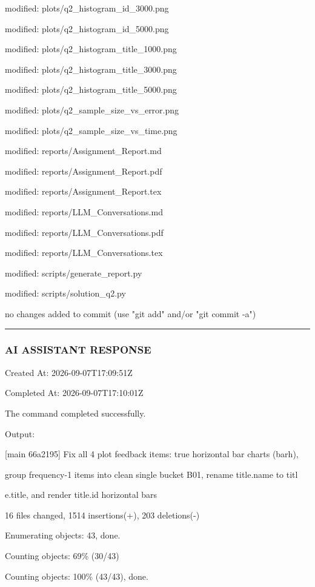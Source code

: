 \documentclass[11pt,a4paper]{article}
\begin{document}
modified:   plots/q2\_histogram\_id\_3000.png

modified:   plots/q2\_histogram\_id\_5000.png

modified:   plots/q2\_histogram\_title\_1000.png

modified:   plots/q2\_histogram\_title\_3000.png

modified:   plots/q2\_histogram\_title\_5000.png

modified:   plots/q2\_sample\_size\_vs\_error.png

modified:   plots/q2\_sample\_size\_vs\_time.png

modified:   reports/Assignment\_Report.md

modified:   reports/Assignment\_Report.pdf

modified:   reports/Assignment\_Report.tex

modified:   reports/LLM\_Conversations.md

modified:   reports/LLM\_Conversations.pdf

modified:   reports/LLM\_Conversations.tex

modified:   scripts/generate\_report.py

modified:   scripts/solution\_q2.py


no changes added to commit (use "git add" and/or "git commit -a")


\hrule

\subsubsection{AI ASSISTANT RESPONSE}

Created At: 2026-09-07T17:09:51Z

Completed At: 2026-09-07T17:10:01Z


The command completed successfully.

Output:

[main 66a2195] Fix all 4 plot feedback items: true horizontal bar charts (barh),

group frequency-1 items into clean single bucket B01, rename title.name to titl

e.title, and render title.id horizontal bars

16 files changed, 1514 insertions(+), 203 deletions(-)

Enumerating objects: 43, done.

Counting objects:  69\% (30/43)

Counting objects: 100\% (43/43), done.
\end{document}
